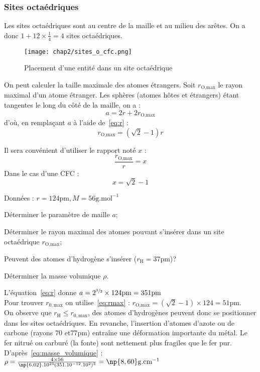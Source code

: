 \subsubsection{Sites octaédriques}
Les sites octaédriques sont au centre de la maille et au milieu
des arêtes. On a donc $1 + 12 \times \frac{1}{4} = 4$ sites octaédriques.
\begin{figure}
    \centering
    \texttt{[image: chap2/sites\_o\_cfc.png]}
    \caption{Placement d'une entité dans un site octaédrique}\label{fig:site_o_cfc}
\end{figure}
On peut calculer la taille maximale des atomes étrangers.
Soit $r_{\text{O,max}}$ le rayon maximal d'un atome étranger.
Les sphères (atomes h\^otes et étrangers) étant tangentes le
long du c\^oté de la maille, on a :
\begin{equation}
    a = 2r + 2r_{\text{O,max}}
\end{equation}
d'où, en remplaçant $a$ à l'aide de~\ref{eq:r} :
\begin{equation}
    \boxed{r_{\text{O,max}} = (\sqrt{2} - 1)r} \label{eq:rmax}
\end{equation}
\begin{rem}
    Il sera convénient d'utiliser le rapport noté $x$ :
    \begin{equation*}
        \frac{r_{\text{O,max}}}{r} = x
    \end{equation*}
    Dans le cas d'une CFC :
    \begin{equation*}
        x = \sqrt{2} - 1
    \end{equation*}
\end{rem}

\begin{ex}
    Données : $r = 124\text{pm}, M = 56\text{g.mol}^{-1}$
    \begin{compactitem}
        \item Déterminer le paramètre de maille $a$;
        \item Déterminer le rayon maximal des atomes pouvant s'insérer dans un
            site octaédrique $r_{\text{O,max}}$;
        \item Peuvent des atomes d'hydrogène s'insérer ($r_{\text{H}} = 37$pm)?
        \item Déterminer la masse volumique $\rho$.
    \end{compactitem}
    L'équation~\ref{eq:r} donne
    $a=2^{\sfrac{3}{2}} \times 124\text{pm} = 351\text{pm}$\\
    Pour trouver $r_{0,\text{max}}$ on utilise~\ref{eq:rmax} :
    $r_{\text{O,max}} = (\sqrt{2} - 1)\times 124 = 51\text{pm}$.\\
    On observe que $r_{\text{H}} \leq r_{0,\text{max}}$, des atomes
    d'hydrogènes peuvent donc se positionner dans les sites
    octaédriques. En revanche, l'insertion d'atomes d'azote ou de
    carbone (rayons $70$ et$77$pm) entraîne une déformation importante
    du métal. Le fer nitrué ou carburé (la fonte) sont nettement
    plus fragiles que le fer pur.\\
    D'après~\ref{eq:masse_volumique} :
    $\rho = \frac{4 \times 56}{\np{6,02}.10^{23}(351.10^{-12}.10^2)^3} = \np{8,60}\text{g.cm}^{-1}$
\end{ex}

